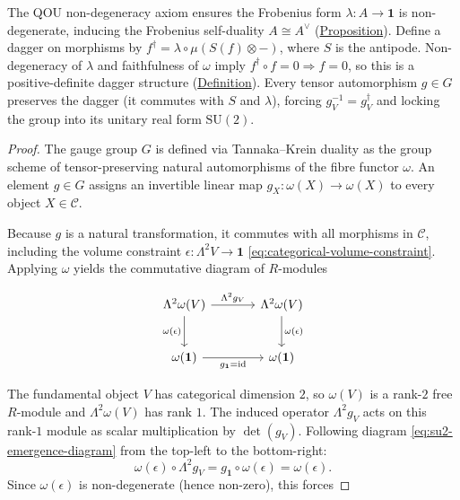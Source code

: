 \begin{theorem}
The QOU non-degeneracy axiom ensures the Frobenius form
$\lambda \colon A \to \mathbf{1}$ is non-degenerate, inducing the
Frobenius self-duality $A \cong A^{\vee}$
(\hyperref[prop:fiber-adjoint-involution]{Proposition}). Define a dagger on
morphisms by $f^{\dagger} = \lambda \circ \mu(S(f) \otimes -)$, where
$S$ is the antipode. Non-degeneracy of $\lambda$ and faithfulness
of $\omega$ imply $f^{\dagger} \circ f = 0 \Rightarrow f = 0$, so this
is a positive-definite dagger structure
(\hyperref[def:positive-definite-dagger]{Definition}). Every tensor
automorphism $g \in G$ preserves the dagger (it commutes with $S$ and
$\lambda$), forcing $g_V^{-1} = g_V^{\dagger}$ and locking the group
into its unitary real form $\mathrm{SU}(2)$.
\end{theorem}
\begin{proof}
The gauge group $G$ is defined via Tannaka--Krein duality as
the group scheme of tensor-preserving natural automorphisms of the fibre
functor $\omega$. An element $g \in G$ assigns an invertible linear map
$g_X \colon \omega(X) \to \omega(X)$ to every object $X \in \mathcal{C}$.

Because $g$ is a natural transformation, it commutes with all morphisms
in $\mathcal{C}$, including the volume constraint
$\epsilon \colon \Lambda^2 V \to \mathbf{1}$
\eqref{eq:categorical-volume-constraint}. Applying $\omega$ yields the
commutative diagram of $R$-modules

\begin{equation}\label{eq:su2-emergence-diagram}
\begin{tikzcd}[row sep=2.5em, column sep=3.5em]
  \Lambda^2 \omega(V)
    \ar[r, "\Lambda^2 g_V"]
    \ar[d, "\omega(\epsilon)"']
  & \Lambda^2 \omega(V)
    \ar[d, "\omega(\epsilon)"]
  \\
  \omega(\mathbf{1})
    \ar[r, "g_{\mathbf{1}} = \mathrm{id}"']
  & \omega(\mathbf{1})
\end{tikzcd}
\end{equation}

The fundamental object $V$ has categorical dimension $2$, so
$\omega(V)$ is a rank-$2$ free $R$-module and $\Lambda^2 \omega(V)$ has
rank $1$. The induced operator $\Lambda^2 g_V$ acts on this rank-$1$
module as scalar multiplication by $\det(g_V)$. Following
diagram \eqref{eq:su2-emergence-diagram} from the top-left to the
bottom-right:
\[
\omega(\epsilon) \circ \Lambda^2 g_V
  =
  g_{\mathbf{1}} \circ \omega(\epsilon)
  =
  \omega(\epsilon).
\]
Since $\omega(\epsilon)$ is non-degenerate (hence non-zero), this forces


\end{proof}
